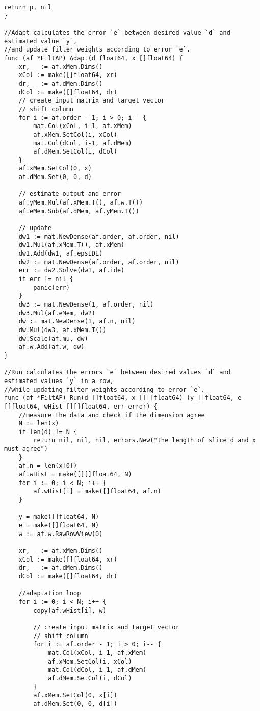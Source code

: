 \begin{lstlisting}[caption=ap.go,label=ap.go]
    return p, nil
}

//Adapt calculates the error `e` between desired value `d` and estimated value `y`,
//and update filter weights according to error `e`.
func (af *FiltAP) Adapt(d float64, x []float64) {
    xr, _ := af.xMem.Dims()
    xCol := make([]float64, xr)
    dr, _ := af.dMem.Dims()
    dCol := make([]float64, dr)
    // create input matrix and target vector
    // shift column
    for i := af.order - 1; i > 0; i-- {
        mat.Col(xCol, i-1, af.xMem)
        af.xMem.SetCol(i, xCol)
        mat.Col(dCol, i-1, af.dMem)
        af.dMem.SetCol(i, dCol)
    }
    af.xMem.SetCol(0, x)
    af.dMem.Set(0, 0, d)

    // estimate output and error
    af.yMem.Mul(af.xMem.T(), af.w.T())
    af.eMem.Sub(af.dMem, af.yMem.T())

    // update
    dw1 := mat.NewDense(af.order, af.order, nil)
    dw1.Mul(af.xMem.T(), af.xMem)
    dw1.Add(dw1, af.epsIDE)
    dw2 := mat.NewDense(af.order, af.order, nil)
    err := dw2.Solve(dw1, af.ide)
    if err != nil {
        panic(err)
    }
    dw3 := mat.NewDense(1, af.order, nil)
    dw3.Mul(af.eMem, dw2)
    dw := mat.NewDense(1, af.n, nil)
    dw.Mul(dw3, af.xMem.T())
    dw.Scale(af.mu, dw)
    af.w.Add(af.w, dw)
}

//Run calculates the errors `e` between desired values `d` and estimated values `y` in a row,
//while updating filter weights according to error `e`.
func (af *FiltAP) Run(d []float64, x [][]float64) (y []float64, e []float64, wHist [][]float64, err error) {
    //measure the data and check if the dimension agree
    N := len(x)
    if len(d) != N {
        return nil, nil, nil, errors.New("the length of slice d and x must agree")
    }
    af.n = len(x[0])
    af.wHist = make([][]float64, N)
    for i := 0; i < N; i++ {
        af.wHist[i] = make([]float64, af.n)
    }

    y = make([]float64, N)
    e = make([]float64, N)
    w := af.w.RawRowView(0)

    xr, _ := af.xMem.Dims()
    xCol := make([]float64, xr)
    dr, _ := af.dMem.Dims()
    dCol := make([]float64, dr)

    //adaptation loop
    for i := 0; i < N; i++ {
        copy(af.wHist[i], w)

        // create input matrix and target vector
        // shift column
        for i := af.order - 1; i > 0; i-- {
            mat.Col(xCol, i-1, af.xMem)
            af.xMem.SetCol(i, xCol)
            mat.Col(dCol, i-1, af.dMem)
            af.dMem.SetCol(i, dCol)
        }
        af.xMem.SetCol(0, x[i])
        af.dMem.Set(0, 0, d[i])


\end{lstlisting}
